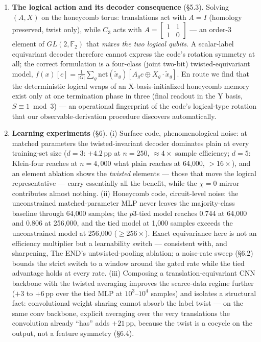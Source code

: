 \documentclass[11pt]{article}
\newcommand{\F}{\mathbb{F}}
\begin{document}
\begin{enumerate}
\item \textbf{The logical action and its decoder consequence} (\S5.3).
Solving $(A, X)$ on the honeycomb torus: translations act with $A = I$
(homology preserved, twist only), while $C_3$ acts with
$A = \left[\begin{smallmatrix}1&1\\1&0\end{smallmatrix}\right]$ --- an
order-3 element of $GL(2,\F_2)$ that \emph{mixes the two logical qubits}. A
scalar-label equivariant decoder therefore cannot express the code's
rotation symmetry at all; the correct formulation is a four-class (joint
two-bit) twisted-equivariant model,
$f(x)[c] = \tfrac{1}{|G|}\sum_g \mathrm{net}(\tilde x_g)[A_g c \oplus
X_g\!\cdot\!\tilde x_g]$. En route we find that the deterministic logical
wraps of an X-basis-initialized honeycomb memory exist only at one
termination phase in three (final readout in the Y basis,
$S \equiv 1 \bmod 3$) --- an operational fingerprint of the code's
logical-type rotation \cite{HH21} that our observable-derivation procedure
discovers automatically.

\item \textbf{Learning experiments} (\S6). (i) Surface code,
phenomenological noise: at matched parameters the twisted-invariant decoder
dominates plain at every training-set size ($d{=}3$: $+4.2$\,pp at $n{=}250$,
$\approx\!4\times$ sample efficiency; $d{=}5$: Klein-four reaches at
$n{=}4{,}000$ what plain reaches at 64{,}000, $>\!16\times$), and an element
ablation shows the \emph{twisted} elements --- those that move the logical
representative --- carry essentially all the benefit, while the $\chi = 0$
mirror contributes almost nothing. (ii) Honeycomb code, circuit-level noise:
the unconstrained matched-parameter MLP never leaves the majority-class
baseline through 64{,}000 samples; the $p3$-tied model reaches 0.744 at
64{,}000 and 0.806 at 256{,}000, and the tied model at 1{,}000 samples
exceeds the unconstrained model at 256{,}000 ($\geq 256\times$). Exact
equivariance here is not an efficiency multiplier but a learnability switch
--- consistent with, and sharpening, The END's untwisted-pooling ablation;
a noise-rate sweep (\S6.2) bounds the strict switch to a window around the
gated rate while the tied advantage holds at every rate.
(iii) Composing a translation-equivariant CNN backbone with the twisted
averaging improves the scarce-data regime further ($+3$ to $+6$\,pp over the
tied MLP at $10^3$--$10^4$ samples) and isolates a structural fact:
convolutional weight sharing cannot absorb the label twist --- on the same
conv backbone, explicit averaging over the very translations the convolution
already ``has'' adds $+21$\,pp, because the twist is a cocycle on the
output, not a feature symmetry (\S6.4).
\end{enumerate}
\end{document}
